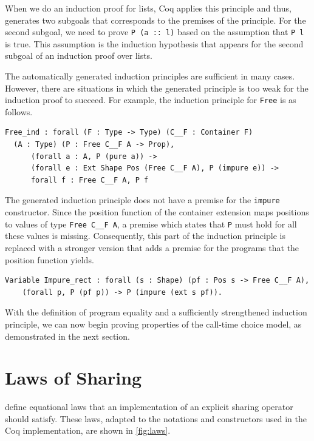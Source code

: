 \documentclass[a4paper, 11pt, fleqn, twoside, abstract=on]{scrreprt}
\newcommand{\cinl}[1]{\texttt{#1}}
\begin{document}
When we do an induction proof for lists, Coq applies this principle and thus, generates two subgoals that corresponds to the premises of the principle.
For the second subgoal, we need to prove \cinl{P (a :: l)} based on the assumption that \cinl{P l} is true.
This assumption is the induction hypothesis that appears for the second subgoal of an induction proof over lists.

The automatically generated induction principles are sufficient in many cases.
However, there are situations in which the generated principle is too weak for the induction proof to succeed.
For example, the induction principle for \cinl{Free} is as follows.

\begin{verbatim}
Free_ind : forall (F : Type -> Type) (C__F : Container F) 
  (A : Type) (P : Free C__F A -> Prop),
      (forall a : A, P (pure a)) -> 
      (forall e : Ext Shape Pos (Free C__F A), P (impure e)) -> 
      forall f : Free C__F A, P f
\end{verbatim}

The generated induction principle does not have a premise for the \cinl{impure} constructor.
Since the position function of the container extension maps positions to values of type \cinl{Free C__F A}, a premise which states that \cinl{P} must hold for all these values is missing.
Consequently, this part of the induction principle is replaced with a stronger version that adds a premise for the programs that the position function yields.

\begin{verbatim}
Variable Impure_rect : forall (s : Shape) (pf : Pos s -> Free C__F A),
    (forall p, P (pf p)) -> P (impure (ext s pf)).
\end{verbatim}

With the definition of program equality and a sufficiently strengthened induction principle, we can now begin proving properties of the call-time choice model, as demonstrated in the next section.

\section{Laws of Sharing}
\citet{fischer2009purely} define equational laws that an implementation of an explicit sharing operator should satisfy.
These laws, adapted to the notations and constructors used in the Coq implementation, are shown in \autoref{fig:laws}.
\end{document}
